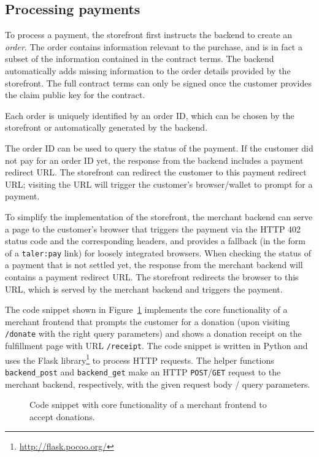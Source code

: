 \subsection{Processing payments}\label{sec:processing-payments}

To process a payment, the storefront first instructs the backend to create an
\emph{order}.  The order contains information relevant to the purchase, and is
in fact a subset of the information contained in the contract terms.  The
backend automatically adds missing information to the order details provided by
the storefront.  The full contract terms can only be signed once the customer
provides the claim public key for the contract.

Each order is uniquely identified by an order ID, which can be chosen by the
storefront or automatically generated by the backend.

The order ID can be used to query the status of the payment.  If the customer
did not pay for an order ID yet, the response from the backend includes a
payment redirect URL.  The storefront can redirect the customer to this
payment redirect URL; visiting the URL will trigger the customer's
browser/wallet to prompt for a payment.

To simplify the implementation of the storefront, the merchant backend can
serve a page to the customer's browser that triggers the payment via the HTTP
402 status code and the corresponding headers, and provides a fallback (in the
form of a \texttt{taler:pay} link) for loosely integrated browsers.
When checking the status of a payment that is not settled yet, the response from the merchant backend
will contains a payment redirect URL.  The storefront redirects the browser to this URL,
which is served by the merchant backend and triggers the payment.

The code snippet shown in Figure~\ref{fig:merchant-donations-code} implements
the core functionality of a merchant frontend that prompts the customer for a
donation (upon visiting \texttt{/donate} with the right query parameters) and
shows a donation receipt on the fulfillment page with URL \texttt{/receipt}.
The code snippet is written in Python and uses the Flask library\footnote{\url{http://flask.pocoo.org/}} to process HTTP requests.
The helper functions \texttt{backend\_post}
and \texttt{backend\_get} make an HTTP \texttt{POST}/\texttt{GET} request to the merchant backend, respectively,
with the given request body / query parameters.

\begin{figure}

\caption[Code snippet for merchant frontend]{Code snippet with core functionality of a merchant frontend to accept donations.}
\label{fig:merchant-donations-code}
\end{figure}



